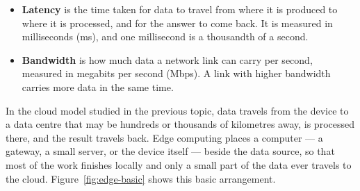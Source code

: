 \documentclass[../main.tex]{subfiles}
\begin{document}
\begin{itemize}
  \item \textbf{Latency} is the time taken for data to travel from where it
        is produced to where it is processed, and for the answer to come
        back. It is measured in milliseconds (ms), and one millisecond is a
        thousandth of a second.
  \item \textbf{Bandwidth} is how much data a network link can carry per
        second, measured in megabits per second (Mbps). A link with higher
        bandwidth carries more data in the same time.
\end{itemize}

In the cloud model studied in the previous topic, data travels from the
device to a data centre that may be hundreds or thousands of kilometres away,
is processed there, and the result travels back. Edge computing places a
computer --- a gateway, a small server, or the device itself --- beside the
data source, so that most of the work finishes locally and only a small part
of the data ever travels to the cloud. Figure~\ref{fig:edge-basic} shows this
basic arrangement.
\end{document}
